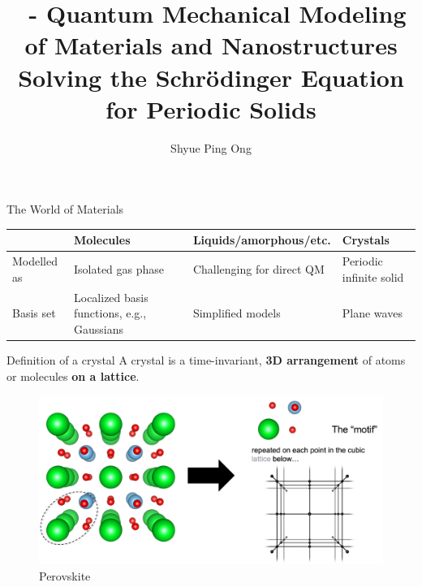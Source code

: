 \documentclass[aspectratio=169]{beamer}
\title[\classname Solving the Schr\"odinger Equation for Periodic Solids]{\classname~- Quantum Mechanical Modeling of Materials and Nanostructures\\Solving the Schr\"odinger Equation for Periodic Solids}
\author{Shyue Ping Ong}
\institute[UCSD]{University of California, San Diego\\
\medskip
}
\date{\classyear} %
\begin{document}
    \begin{frame}
        \titlepage %
    \end{frame}


    \begin{frame}{The World of Materials}

        \begin{table}[]
            \centering
            \begin{tabular}{p{2cm}|p{3cm}|p{4cm}|p{3cm}}
                & Molecules                                  & Liquids/amorphous/etc.    & Crystals                \\
                \hline
                \hline
                Modelled as & Isolated gas phase                         & Challenging for direct QM & Periodic infinite solid \\
                Basis set   & Localized basis functions, e.g., Gaussians & Simplified models         & Plane waves
            \end{tabular}
        \end{table}
    \end{frame}

\begin{frame}{Definition of a crystal}
A crystal is a time-invariant, \textbf{3D arrangement} of atoms or molecules \textbf{on a lattice}.

\begin{figure}
    \centering
    \includegraphics[width=0.6\linewidth]{lectures/figures/7_crystal.png}
    \caption{Perovskite }
\end{figure}

\end{frame}
\end{document}
